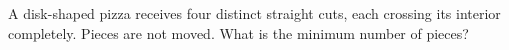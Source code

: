 A disk-shaped pizza receives four distinct straight cuts, each crossing its interior completely. Pieces are not moved. What is the minimum number of pieces?
